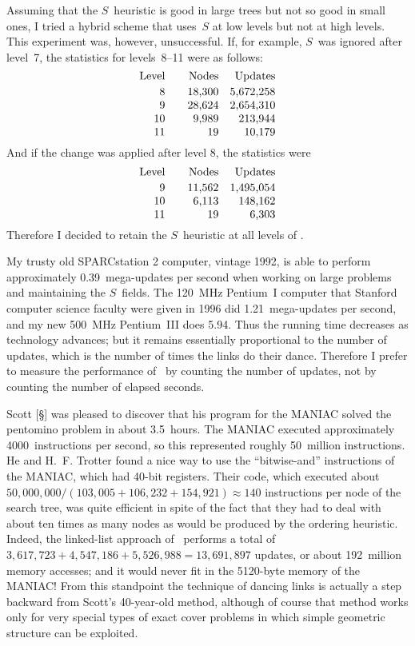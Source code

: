 Assuming that the $S$~heuristic is good in large trees but not so good
in small ones, I tried a hybrid scheme that uses~$S$ at low levels but
not at high levels.  This experiment was, however, unsuccessful.  If,
for example, $S$~was ignored after level~7, the statistics for
levels~8--11 were as follows:
$$\vbox{\halign{\hfil#\qquad&\hfil#\quad&\hfil#\cr
Level&Nodes&Updates\cr
\noalign{\vskip2pt}
8&18{,}300&5{,}672{,}258\cr
9&28{,}624&2{,}654{,}310\cr
10&9{,}989&213{,}944\cr
11&19&10{,}179\cr}}$$
And if the change was applied after level 8, the statistics were
$$\postdisplaypenalty=10000
\vbox{\halign{\hfil#\qquad&\hfil#\quad&\hfil#\cr
Level&Nodes&Updates\cr
\noalign{\vskip2pt}
9&11,562&1,495,054\cr
10&6,113&148,162\cr
11&19&6,303\cr}}$$
Therefore I decided to retain the $S$~heuristic at all levels of \algoDLX.

My trusty old {\mc SPARC}station 2 computer, vintage 1992, is able to
perform approximately 0.39~mega-updates per second when working on
large problems and maintaining the $S$~fields.  The 120~MHz Pentium~I
computer that Stanford computer science faculty were given
in 1996 did 1.21~mega-updates per second, and
my new 500~MHz Pentium~III does 5.94.  Thus the running time decreases
as technology advances; but it remains essentially proportional to the
number of updates, which is the number of times the links do their
dance.  Therefore I prefer to measure the performance of \algoDLX\ by
counting the number of updates, not by counting the number of elapsed seconds.

Scott [\S] was pleased to discover that his program for the {\mc MANIAC}
solved the pentomino problem in about 3.5~hours.  The {\mc MANIAC} executed
approximately 4000~instructions per second, so this represented
roughly 50~million instructions.  He and H.~F. Trotter found a nice way
to use the ``bitwise-and'' instructions of the
{\mc MANIAC}, which had 40-bit registers.  Their code, which executed about
$50{,}000{,}000/(103{,}005+106{,}232+154{,}921)\approx 140$ instructions per node of
the search tree, was quite efficient in spite of the fact that they
had to deal with about ten times as many nodes as would be produced by
the ordering heuristic.  Indeed, the linked-list approach of \algoDLX\
performs a total of $3{,}617{,}723 + 4{,}547{,}186 + 5{,}526{,}988 = 13{,}691{,}897$
updates, or about 192~million memory accesses; and it would never fit
in the 5120-byte memory of the {\mc MANIAC}!  From this standpoint the
technique of dancing links is actually a step backward from Scott's
40-year-old method, although of course that method works only for
very special types of exact cover problems in which simple geometric
structure can be exploited.

